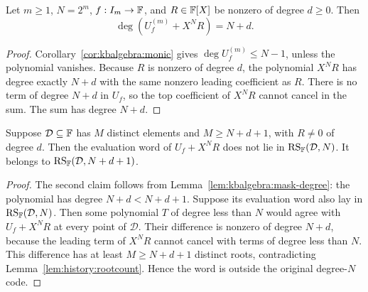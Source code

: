 \begin{lemma}\label{lem:kbalgebra:mask-degree}
Let $m\geq1$, $N=2^m$, $f:I_m\to\mathbb{F}$, and $R\in\mathbb{F}[X]$ be nonzero of degree $d\geq0$. Then
\begin{equation}\label{eq:kbalgebra:mask-degree}
 \boxed{\deg(U_f^{(m)}+X^N R)=N+d.}
\end{equation}
\end{lemma}
\begin{proof}
Corollary~\ref{cor:kbalgebra:monic} gives $\deg U_f^{(m)}\leq N-1$, unless the polynomial vanishes. Because $R$ is nonzero of degree $d$, the polynomial $X^NR$ has degree exactly $N+d$ with the same nonzero leading coefficient as $R$. There is no term of degree $N+d$ in $U_f$, so the top coefficient of $X^NR$ cannot cancel in the sum. The sum has degree $N+d$.
\end{proof}

\begin{corollary}\label{cor:kbalgebra:mask-rate}
Suppose $\mathcal D\subseteq\mathbb{F}$ has $M$ distinct elements and $M\geq N+d+1$, with $R\neq0$ of degree $d$. Then the evaluation word of $U_f+X^NR$ does not lie in $\operatorname{RS}_{\mathbb{F}}(\mathcal D,N)$. It belongs to $\operatorname{RS}_{\mathbb{F}}(\mathcal D,N+d+1)$.
\end{corollary}
\begin{proof}
The second claim follows from Lemma~\ref{lem:kbalgebra:mask-degree}: the polynomial has degree $N+d<N+d+1$. Suppose its evaluation word also lay in $\operatorname{RS}_{\mathbb{F}}(\mathcal D,N)$. Then some polynomial $T$ of degree less than $N$ would agree with $U_f+X^NR$ at every point of $\mathcal D$. Their difference is nonzero of degree $N+d$, because the leading term of $X^NR$ cannot cancel with terms of degree less than $N$. This difference has at least $M\geq N+d+1$ distinct roots, contradicting Lemma~\ref{lem:history:rootcount}. Hence the word is outside the original degree-$N$ code.
\end{proof}
